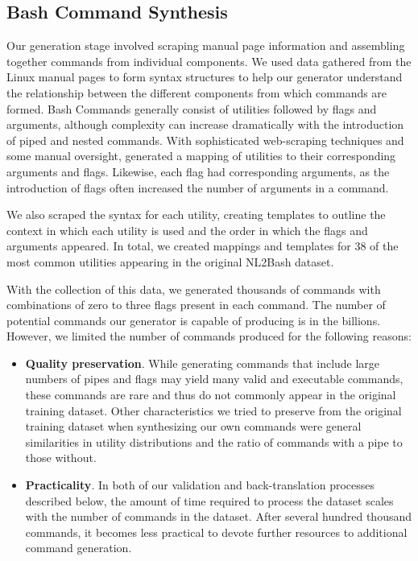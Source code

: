 \documentclass{river-journal}
\begin{document}
\subsection{Bash Command Synthesis} 
\label{arch.Bashcommandgeneration}

Our generation stage involved scraping manual page information and assembling together commands from individual components. We used data gathered from the Linux manual pages to form syntax structures to help our generator understand the relationship between the different components from which commands are formed. Bash Commands generally consist of utilities followed by flags and arguments, although complexity can increase dramatically with the introduction of piped and nested commands. With sophisticated web-scraping techniques and some manual oversight, generated a mapping of utilities to their corresponding arguments and flags. Likewise, each flag had corresponding arguments, as the introduction of flags often increased the number of arguments in a command. 

We also scraped the syntax for each utility, creating templates to outline the context in which each utility is used and the order in which the flags and arguments appeared. In total, we created mappings and templates for 38 of the most common utilities appearing in the original NL2Bash dataset.

With the collection of this data, we generated thousands of commands with combinations of zero to three flags present in each command. The number of potential commands our generator is capable of producing is in the billions. However, we limited the number of commands produced for the following reasons:

\begin{itemize}
\item {\bf Quality preservation}. While generating commands that include large numbers of pipes and flags may yield many valid and executable commands, these commands are rare and thus do not commonly appear in the original training dataset. Other characteristics we tried to preserve from the original training dataset when synthesizing our own commands were general similarities in utility distributions and the ratio of commands with a pipe to those without.

\item {\bf Practicality}. In both of our validation and back-translation processes described below, the amount of time required to process the dataset scales with the number of commands in the dataset. After several hundred thousand commands, it becomes less practical to devote further resources to additional command generation.
\end{itemize}
\end{document}
